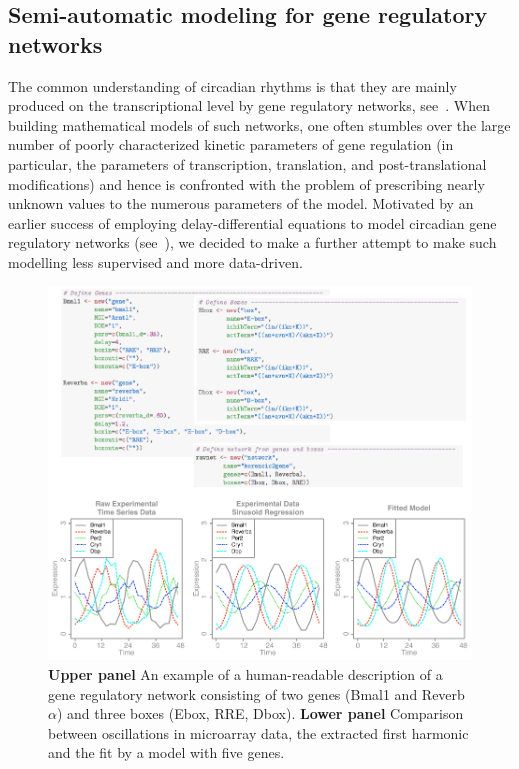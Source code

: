 \subsection{Semi-automatic modeling for gene regulatory networks} The
common understanding of circadian rhythms is that they are mainly
produced on the transcriptional level by gene regulatory networks,
see~\cite{reppert2002coordination}. When building mathematical models
of such networks, one often stumbles over the large number of poorly
characterized kinetic parameters of gene regulation (in particular,
the parameters of transcription, translation, and post-translational
modifications) and hence is confronted with the problem of prescribing
nearly unknown values to the numerous parameters of the model.
Motivated by an earlier success of employing delay-differential
equations to model circadian gene regulatory networks
(see~\cite{korencic2012interplay}), we decided to make a further
attempt to make such modelling less supervised and more data-driven.


\begin{figure}
\begin{center}
\includegraphics[width=\linewidth]{figures/matt/matt.pdf}
\end{center}
\caption{
  {\bf Upper panel} An example of a human-readable description of a
  gene regulatory network consisting of two genes (Bmal1 and
  Reverb$\alpha$) and three boxes (Ebox, RRE, Dbox).
  {\bf Lower panel} Comparison between oscillations in microarray
  data, the extracted first harmonic and the fit by a model with five
  genes.
\label{fig::matt}
}
\end{figure}

